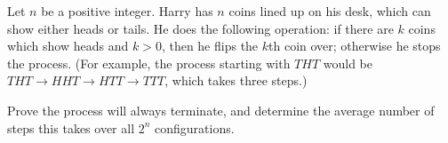 Let $n$ be a positive integer.
Harry has $n$ coins lined up on his desk, which can show either heads or tails.
He does the following operation: if there are $k$ coins which show heads and $k > 0$,
then he flips the $k$th coin over; otherwise he stops the process.
(For example, the process starting with $THT$ would be
$THT \to HHT \to HTT \to TTT$, which takes three steps.)

Prove the process will always terminate, and determine the average number of steps
this takes over all $2^n$ configurations.